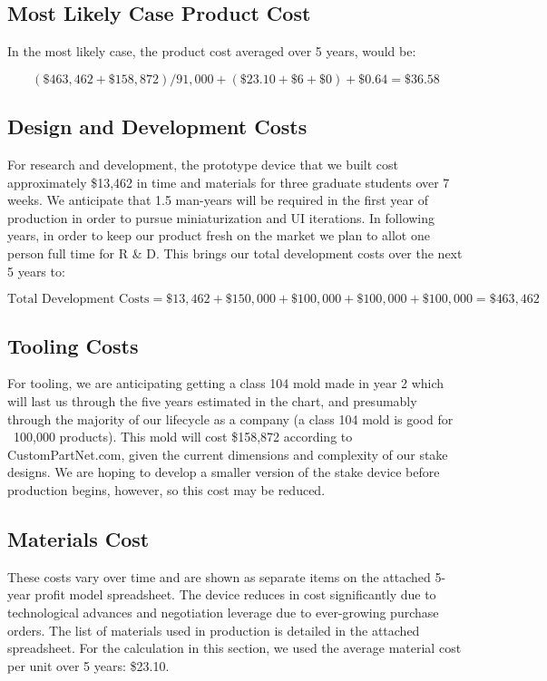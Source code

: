 \documentclass[11pt]{article}
\begin{document}
\subsection{Most Likely Case Product Cost}

In the most likely case, the product cost averaged over 5 years, would be:

$$
(\$463,462 + \$158,872)/91,000 + (\$23.10 + \$6 + \$0) + \$0.64 = \$36.58
$$

\subsection{Design and Development Costs}

For research and development, the prototype device that we built cost approximately \$13,462 in time and materials for three graduate students over 7 weeks.  We anticipate that 1.5 man-years will be required in the first year of production in order to pursue miniaturization and UI iterations.  In following years, in order to keep our product fresh on the market we plan to allot one person full time for R \& D. This brings our total development costs over the next 5 years to:

$$\textrm{Total Development Costs} = \$13,462 + \$150,000 + \$100,000 + \$100,000 + \$100,000 = \$463,462$$

\subsection{Tooling Costs}

For tooling, we are anticipating getting a class 104 mold made in year 2 which will last us through the five years estimated in the chart, and presumably through the majority of our lifecycle as a company (a class 104 mold is good for ~100,000 products).  This mold will cost \$158,872 according to CustomPartNet.com, given the current dimensions and complexity of our stake designs.  We are hoping to develop a smaller version of the stake device before production begins, however, so this cost may be reduced.

\subsection{Materials Cost}

These costs vary over time and are shown as separate items on the attached 5-year profit model spreadsheet. The device reduces in cost significantly due to technological advances and negotiation leverage due to ever-growing purchase orders. The list of materials used in production is detailed in the attached spreadsheet. For the calculation in this section, we used the average material cost per unit over 5 years: \$23.10.
\end{document}
